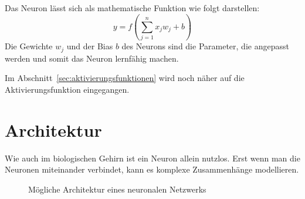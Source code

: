 \documentclass[12pt,a4paper]{report}
\begin{document}
Das Neuron lässt sich als mathematische Funktion wie folgt darstellen:
\[y =f\left(\sum_{j=1}^{n} x_j w_j + b\right)\]
Die Gewichte $w_j$ und der Bias $b$ des Neurons sind die Parameter, die angepasst werden und somit das Neuron lernfähig machen.

Im Abschnitt~\ref{sec:aktivierungsfunktionen} wird noch näher auf die Aktivierungsfunktion eingegangen.

\section{Architektur}
Wie auch im biologischen Gehirn ist ein Neuron allein nutzlos.
Erst wenn man die Neuronen miteinander verbindet, kann es komplexe Zusammenhänge modellieren.
\begin{figure}[!h]
    \centering
{}
    \caption{Mögliche Architektur eines neuronalen Netzwerks}
    \label{fig:network1}
\end{figure}
\end{document}
